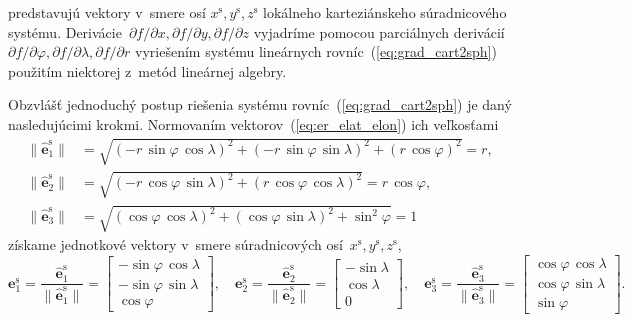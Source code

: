 \documentclass[a4paper, 12pt]{book}
\let\vec\mathbf
\begin{document}
%
predstavujú vektory v~smere osí $x^{\mathrm{s}}, y^{\mathrm{s}}, 
z^{\mathrm{s}}$ lokálneho karteziánskeho súradnicového systému.  
Derivácie~$\partial f \slash \partial x, \partial f \slash \partial y, \partial 
f \slash \partial z$ vyjadríme pomocou parciálnych derivácií $\partial f \slash 
\partial \varphi, \partial f \slash \partial \lambda, \partial f \slash 
\partial r$ vyriešením systému lineárnych rovníc~(\ref{eq:grad_cart2sph}) 
použitím niektorej z~metód lineárnej algebry.

Obzvlášť jednoduchý postup riešenia systému rovníc~(\ref{eq:grad_cart2sph}) je 
daný nasledujúcimi krokmi.  Normovaním vektorov~(\ref{eq:er_elat_elon}) ich 
veľkosťami
%
\begin{equation}
\begin{aligned}
\| \hat{\vec e}_1^\mathrm{s} \| &= \sqrt{(-r \, \sin\varphi \, \cos\lambda)^2 
+ (-r \, \sin\varphi \, \sin\lambda)^2 + (r \, \cos\varphi)^2} = r{,}\\
%
\| \hat{\vec e}_2^\mathrm{s} \| &= \sqrt{(-r \, \cos\varphi \, \sin\lambda)^2 
+ (r \, \cos\varphi \, \cos\lambda)^2} = r \, \cos\varphi{,}\\
%
\| \hat{\vec e}_3^\mathrm{s} \| &= \sqrt{(\cos\varphi \, \cos\lambda)^2 
+ (\cos\varphi \, \sin\lambda)^2 + \sin^2\varphi} = 1
%
\end{aligned}
\end{equation}
%
získame jednotkové vektory v~smere súradnicových osí~$x^\mathrm{s}, 
y^\mathrm{s}, z^\mathrm{s}$,
%
\begin{equation}
\label{eq:er_elat_elon_unit}
%
\vec e^\mathrm{s}_1 = \frac{\hat{\vec e}_1^\mathrm{s}}{\| \hat{\vec 
e}_1^\mathrm{s} \|} = 
%
\begin{bmatrix}
-\sin\varphi \, \cos\lambda\\
-\sin\varphi \, \sin\lambda\\
\cos\varphi
\end{bmatrix}
%
{,}\quad
%
\vec e^\mathrm{s}_2 = \frac{\hat{\vec e}_2^\mathrm{s}}{\| \hat{\vec 
e}_2^\mathrm{s} \|} = 
%
\begin{bmatrix}
-\sin\lambda\\
\cos\lambda\\
0
\end{bmatrix}
%
{,}\quad
%
\vec e^\mathrm{s}_3 = \frac{\hat{\vec e}_3^\mathrm{s}}{\| \hat{\vec 
e}_3^\mathrm{s} \|} = 
%
\begin{bmatrix}
\cos\varphi \, \cos\lambda\\
\cos\varphi \, \sin\lambda\\
\sin\varphi
\end{bmatrix}
%
{.}
%
\end{equation}
\end{document}
